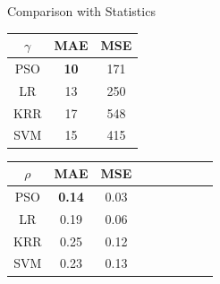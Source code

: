 \documentclass[hyperref={pdfpagelabels=false}, aspectratio=43, t]{beamer}  %
\begin{document}

\begin{frame}{Comparison with Statistics}
\begin{table}[htb]
	\centering
	\begin{tabular}{c cc }
    \hline\hline
        $\gamma$&  MAE&   MSE\\
    \hline
		PSO&   \textbf{10}& 171\\
        LR&    13& 250\\
        KRR &17 &548 \\
        SVM& 15&  415\\
    \hline\hline
	\end{tabular}
	\pause
	\begin{tabular}{c cc cc cc cc}
    \hline\hline
        $\rho$&  MAE&   MSE\\
    \hline
		PSO&   \textbf{0.14}&   0.03\\
        LR&    0.19&   0.06\\
        KRR &0.25 &0.12 \\
        SVM &0.23 &0.13 \\
    \hline\hline
	\end{tabular}
	\label{tab:post-emma}
\end{table}
\end{frame}
    
\end{document}
